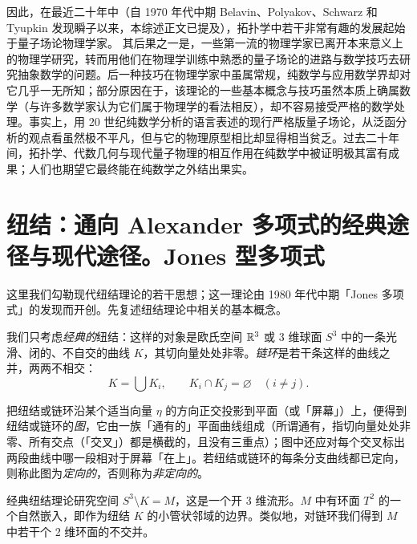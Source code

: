 因此，在最近二十年中（自 1970 年代中期 Belavin、Polyakov、Schwarz 和 Tyupkin 发现瞬子以来，本综述正文已提及），拓扑学中若干非常有趣的发展起始于量子场论物理学家。
其后果之一是，一些第一流的物理学家已离开本来意义上的物理学研究，转而用他们在物理学训练中熟悉的量子场论的进路与数学技巧去研究抽象数学的问题。后一种技巧在物理学家中虽属常规，纯数学与应用数学界却对它几乎一无所知；部分原因在于，该理论的一些基本概念与技巧虽然本质上确属数学（与许多数学家认为它们属于物理学的看法相反），却不容易接受严格的数学处理。事实上，用 20 世纪纯数学分析的语言表述的现行严格版量子场论，从泛函分析的观点看虽然极不平凡，但与它的物理原型相比却显得相当贫乏。过去二十年间，拓扑学、代数几何与现代量子物理的相互作用在纯数学中被证明极其富有成果；人们也期望它最终能在纯数学之外结出果实。

\section[纽结：从 Alexander 多项式到 Jones 多项式]{纽结：通向 Alexander 多项式的经典途径与现代途径。Jones 型多项式}


这里我们勾勒现代纽结理论的若干思想；这一理论由 1980 年代中期「Jones 多项式」的发现而开创。先复述纽结理论中相关的基本概念。

我们只考虑\emph{经典的}纽结：这样的对象是欧氏空间 $\mathbb{R}^3$ 或 3 维球面 $S^3$ 中的一条光滑、闭的、不自交的曲线 $K$，其切向量处处非零。\emph{链环}是若干条这样的曲线之并，两两不相交：
\[
K=\bigcup K_i,\qquad K_i\cap K_j=\varnothing\quad (i\ne j).
\]

把纽结或链环沿某个适当向量 $\eta$ 的方向正交投影到平面（或「屏幕」）上，便得到纽结或链环的\emph{图}，它由一族「通有的」平面曲线组成（所谓通有，指切向量处处非零、所有交点（「交叉」）都是横截的，且没有三重点）；图中还应对每个交叉标出两段曲线中哪一段相对于屏幕「在上」。若纽结或链环的每条分支曲线都已定向，则称此图为\emph{定向的}，否则称为\emph{非定向的}。


经典纽结理论研究空间 $S^3\setminus K=M$，这是一个开 3 维流形。$M$ 中有环面 $T^2$ 的一个自然嵌入，即作为纽结 $K$ 的小管状邻域的边界。类似地，对链环我们得到 $M$ 中若干个 2 维环面的不交并。

